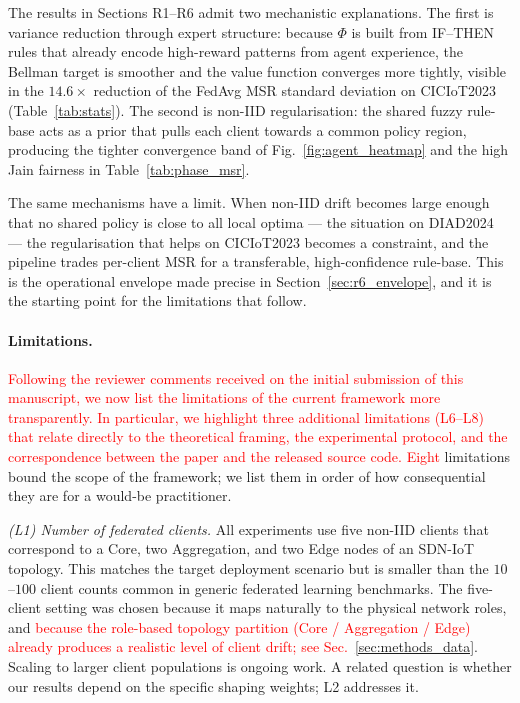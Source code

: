 \documentclass[journal]{IEEEtran}
\newcommand{\rev}[1]{\textcolor{red}{#1}}
\begin{document}
The results in Sections R1--R6 admit two mechanistic explanations.
The first is variance reduction through expert structure: because
$\Phi$ is built from IF--THEN rules that already encode high-reward
patterns from agent experience, the Bellman target is smoother and
the value function converges more tightly, visible in the
$14.6\times$ reduction of the FedAvg MSR standard deviation on
CICIoT2023 (Table~\ref{tab:stats}). The second is non-IID
regularisation: the shared fuzzy rule-base acts as a prior that
pulls each client towards a common policy region, producing the
tighter convergence band of Fig.~\ref{fig:agent_heatmap} and the
high Jain fairness in Table~\ref{tab:phase_msr}.

The same mechanisms have a limit. When non-IID drift becomes large
enough that no shared policy is close to all local optima --- the
situation on DIAD2024 --- the regularisation that helps on
CICIoT2023 becomes a constraint, and the pipeline trades per-client
MSR for a transferable, high-confidence rule-base. This is the
operational envelope made precise in Section~\ref{sec:r6_envelope},
and it is the starting point for the limitations that follow.

\label{sec:limitations}
\paragraph{Limitations.} \rev{Following the reviewer comments received on the initial submission of this manuscript, we now list the limitations of the current framework more transparently. In particular, we highlight three additional limitations (L6--L8) that relate directly to the theoretical framing, the experimental protocol, and the correspondence between the paper and the released source code.} \rev{Eight} limitations bound the scope of the
framework; we list them in order of how consequential they are for a
would-be practitioner.

\emph{(L1) Number of federated clients.} All experiments use five
non-IID clients that correspond to a Core, two Aggregation, and two
Edge nodes of an SDN-IoT topology. This matches the target
deployment scenario but is smaller than the $10$--$100$ client
counts common in generic federated learning benchmarks. The
five-client setting was chosen because it maps naturally to the
physical network roles, and \rev{because the role-based topology partition (Core / Aggregation / Edge) already produces a realistic level of client drift; see Sec.~\ref{sec:methods_data}}. Scaling to larger client populations is ongoing
work. A related question is whether our results depend on the
specific shaping weights; L2 addresses it.
\end{document}
